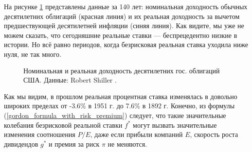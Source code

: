 На рисунке \ref{long_run_interest_rates} представлены данные за 140 лет: номинальная доходность обычных десятилетних облигаций (красная линия) и их реальная доходность за вычетом предшествующей десятилетней инфляции (синяя линия). Как видите, мы уже не можем сказать, что сегодняшние реальные ставки --- беспрецедентно низкие в истории. Но всё равно периодов, когда безрисковая реальная ставка уходила ниже нуля, не так много.



\begin{figure}[ht]
\centering
{}
\caption{Номинальная и реальная доходность десятилетних гос. облигаций США. Данные: Robert Shiller \cite{shillerOnline}.}
\label{long_run_interest_rates}
\end{figure}

Как мы видим, в прошлом реальная процентная ставка изменялась в довольно широких пределах от -3.6\% в 1951 г. до 7.6\% в 1892 г. Конечно, из формулы (\ref{gordon_formula_with_risk_premium}) следует, что такие значительные колебания безрисковой реальной ставки $f^*$ могут вызвать значительные изменения соотношения $P/E$, даже если прибыли компаний $E$, скорость роста дивидендов $g^*$ и премия за риск $\pi$ не меняются.

